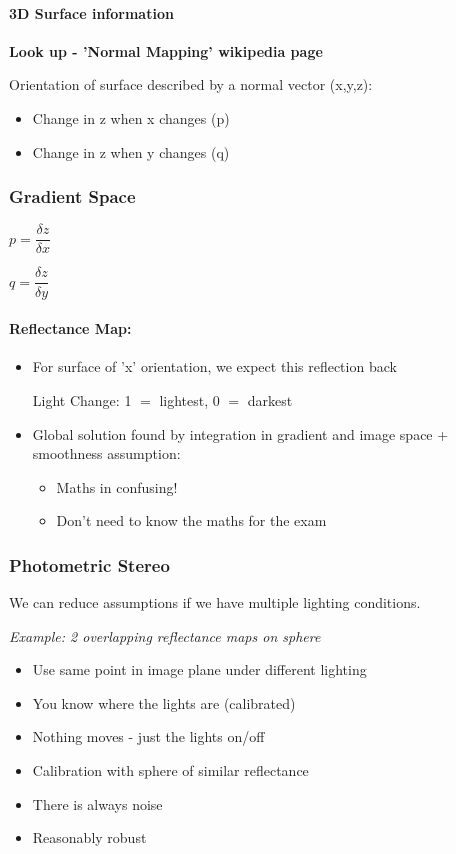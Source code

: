 \documentclass[paper=a4, fontsize=11pt]{article} %
\numberwithin{equation}{section} %
\numberwithin{figure}{section} %
\numberwithin{table}{section} %
\begin{document}
\paragraph{3D Surface information}

\textbf{Look up - 'Normal Mapping' wikipedia page}

Orientation of surface described by a normal vector (x,y,z):
\begin{itemize}
\item Change in z when x changes (p)
\item Change in z when y changes (q)
\end{itemize}

\subsubsection{Gradient Space}

$p = \dfrac{\delta z}{\delta x}$

$q = \dfrac{\delta z}{\delta y}$

\paragraph{Reflectance Map:}
\begin{itemize}
\item For surface of 'x' orientation, we expect this reflection back
\item[Light Change: ] 1 $=$ lightest, 0 $=$ darkest
\item Global solution found by integration in gradient and image space + smoothness assumption:
\begin{itemize}
\item Maths in confusing!
\item Don't need to know the maths for the exam
\end{itemize}
\end{itemize}


\subsubsection{Photometric Stereo}

We can reduce assumptions if we have multiple lighting conditions.

\textit{Example: 2 overlapping reflectance maps on sphere}

\begin{itemize}
\item Use same point in image plane under different lighting
\item You know where the lights are (calibrated)
\item Nothing moves - just the lights on/off
\item Calibration with sphere of similar reflectance
\item There is always noise
\item Reasonably robust
\end{itemize}
\end{document}
